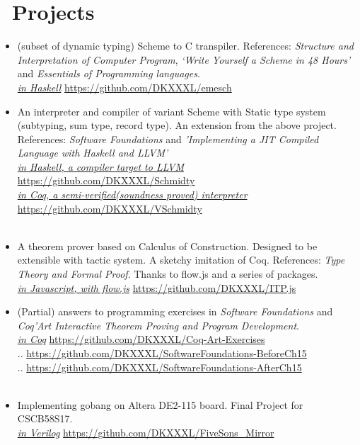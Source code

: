 \documentclass{resume}
\begin{document}
\section{\faCogs\ Projects}
\begin{itemize}
\item (subset of dynamic typing) Scheme to C transpiler. References: \textit{Structure and Interpretation of Computer Program}, \textit{‘Write Yourself a Scheme in 48 Hours’} and \textit{Essentials of Programming languages}. \\
\textit{\underline{in Haskell}} \hfill \url{https://github.com/DKXXXL/emesch}
\\
\item An interpreter and compiler of variant Scheme with Static type system (subtyping, sum type, record type). An extension from the above project. References: \textit{Software Foundations} and \textit{'Implementing a JIT Compiled Language with Haskell and LLVM'} \\
\textit{\underline{in Haskell, a compiler target to LLVM}} \hfill \url{https://github.com/DKXXXL/Schmidty} \\
\textit{\underline{in Coq, a semi-verified(soundness proved) interpreter}} \hfill \url{https://github.com/DKXXXL/VSchmidty} \\
\\
\item A theorem prover based on Calculus of Construction. Designed to be extensible with tactic system. A sketchy imitation of Coq. References: \textit{Type Theory and Formal Proof}. Thanks to flow.js and a series of packages.\\
\textit{\underline{in Javascript, with flow.js}} \hfill \url{https://github.com/DKXXXL/ITP.js}
\\
\item (Partial) answers to programming exercises in \textit{Software Foundations} and \textit{Coq’Art Interactive Theorem Proving and Program Development}. \\
\textit{\underline{in Coq}} \hfill \url{https://github.com/DKXXXL/Coq-Art-Exercises} \\
..  \hfill \url{https://github.com/DKXXXL/SoftwareFoundations-BeforeCh15} \\
..  \hfill \url{https://github.com/DKXXXL/SoftwareFoundations-AfterCh15} \\
\\
\item Implementing gobang on Altera DE2-115 board. Final Project for CSCB58S17. \\
\textit{\underline{in Verilog}} 
\hfill \url{https://github.com/DKXXXL/FiveSons\_Mirror}

\end{itemize}
\end{document}

